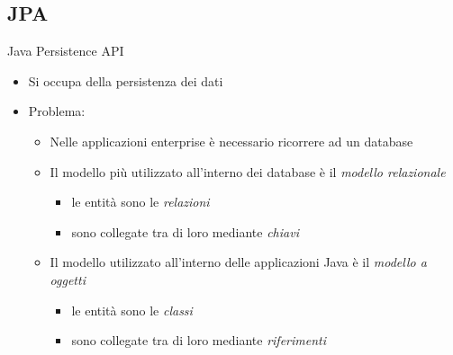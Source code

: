 \subsection{JPA}
\begin{frame}{Java Persistence API}

\begin{itemize}
\item Si occupa della persistenza dei dati
\end{itemize}

\begin{itemize}
\item Problema:

	\begin{itemize}
	\item Nelle applicazioni enterprise è necessario ricorrere ad un database
	
	\item Il modello più utilizzato all'interno dei database è il \textsl{modello relazionale}
		\begin{itemize}
		\item le entità sono le \textsl{relazioni}
		\item sono collegate tra di loro mediante \textsl{chiavi}
		\end{itemize}
	
	\item Il modello utilizzato all'interno delle applicazioni Java è il \textsl{modello a oggetti}
		\begin{itemize}
		\item le entità sono le \textsl{classi}
		\item sono collegate tra di loro mediante \textsl{riferimenti}
		\end{itemize}
	
	\end{itemize}

\end{itemize}

\end{frame}


